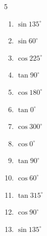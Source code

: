 \begin{multicols}{5}
\begin{enumerate}
  \item $\displaystyle \sin{135^\circ}$


  \item $\displaystyle \sin{60^\circ}$


  \item $\displaystyle \cos{225^\circ}$


  \item $\displaystyle \tan{90^\circ}$

        \phantom{$\displaystyle なし$}

  \item $\displaystyle \cos{180^\circ}$

        \phantom{$\displaystyle =-1$}

  \item $\displaystyle \tan{0^\circ}$

        \phantom{$\displaystyle =0$}

  \item $\displaystyle \cos{300^\circ}$


  \item $\displaystyle \cos{0^\circ}$

        \phantom{$\displaystyle =1$}

  \item $\displaystyle \tan{90^\circ}$

        \phantom{$\displaystyle なし$}

\columnbreak %

  \item $\displaystyle \cos{60^\circ}$


  \item $\displaystyle \tan{315^\circ}$

        \phantom{$\displaystyle =-1$}

  \item $\displaystyle \cos{90^\circ}$

        \phantom{$\displaystyle =0$}

  \item $\displaystyle \sin{135^\circ}$


\end{enumerate}
\end{multicols}
